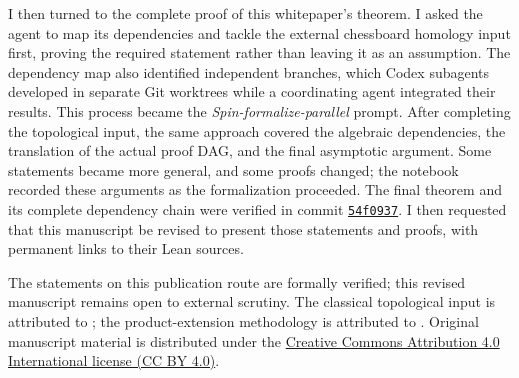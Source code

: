 I then turned to the complete proof of this whitepaper's theorem.
I asked the agent to map its dependencies and tackle the external chessboard
homology input first, proving the required statement rather than leaving it
as an assumption. The dependency map also identified independent branches,
which Codex subagents developed in separate Git worktrees while a coordinating
agent integrated their results. This process became the
\emph{Spin-formalize-parallel} prompt. After completing the topological input,
the same approach covered the algebraic dependencies, the translation of the
actual proof DAG, and the final asymptotic argument. Some statements became
more general, and some proofs changed; the notebook recorded these arguments
as the formalization proceeded. The final theorem and its complete dependency
chain were verified in commit
\href{https://github.com/kbr-/math-research/commit/54f09378e97465522b7f1caf115f90ad1faa7a57}
{\texttt{54f0937}}. I then requested that this manuscript be revised
to present those statements and proofs, with permanent links to their Lean
sources.

The statements on this publication route are formally verified; this revised
manuscript remains open to external scrutiny.
The classical topological input is attributed to \cite{BLVZ94};
the product-extension methodology is attributed to \cite{BIKPRS}.
Original manuscript material is distributed under the
\href{https://creativecommons.org/licenses/by/4.0/}
{Creative Commons Attribution 4.0 International license (CC BY 4.0)}.
